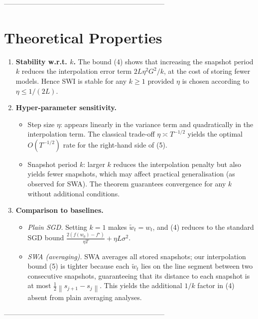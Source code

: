 \documentclass{article}
\newcommand{\norm}[1]{\left\lVert #1\right\rVert}
\begin{document}
---------------------------------------------------------------------

\section*{Theoretical Properties}
\begin{enumerate}[label=(\alph*)]
    \item \textbf{Stability w.r.t. $k$.} The bound (4) shows that increasing the snapshot period $k$ reduces the interpolation error term $2L\eta^2 G^2/k$, at the cost of storing fewer models. Hence SWI is stable for any $k\ge1$ provided $\eta$ is chosen according to $\eta\le 1/(2L)$.
    \item \textbf{Hyper‑parameter sensitivity.}  
    \begin{itemize}
        \item Step size $\eta$: appears linearly in the variance term and quadratically in the interpolation term. The classical trade‑off $\eta\asymp T^{-1/2}$ yields the optimal $O(T^{-1/2})$ rate for the right‑hand side of (5).
        \item Snapshot period $k$: larger $k$ reduces the interpolation penalty but also yields fewer snapshots, which may affect practical generalisation (as observed for SWA). The theorem guarantees convergence for any $k$ without additional conditions.
    \end{itemize}
    \item \textbf{Comparison to baselines.}
    \begin{itemize}
        \item \emph{Plain SGD.} Setting $k=1$ makes $\widetilde w_t=w_t$, and (4) reduces to the standard SGD bound $\frac{2(f(w_0)-f^{\star})}{\eta T}+\eta L\sigma^2$.
        \item \emph{SWA (averaging).} SWA averages all stored snapshots; our interpolation bound (5) is tighter because each $\widetilde w_t$ lies on the line segment between two consecutive snapshots, guaranteeing that its distance to each snapshot is at most $\frac12\norm{s_{j+1}-s_j}$. This yields the additional $1/k$ factor in (4) absent from plain averaging analyses.
    \end{itemize}
\end{enumerate}

---------------------------------------------------------------------
\end{document}

